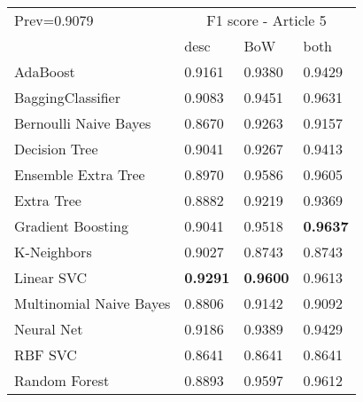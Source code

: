 \begin{tabular}{|l|l|l|l| }
\hline
Prev=0.9079 &  \multicolumn{3}{c|}{F1 score - Article 5} \\
\cline{2-4} & desc & BoW & both \\ \hline
AdaBoost                & 0.9161 & 0.9380 & 0.9429\\
BaggingClassifier       & 0.9083 & 0.9451 & 0.9631\\
Bernoulli Naive Bayes   & 0.8670 & 0.9263 & 0.9157\\
Decision Tree           & 0.9041 & 0.9267 & 0.9413\\
Ensemble Extra Tree     & 0.8970 & 0.9586 & 0.9605\\
Extra Tree              & 0.8882 & 0.9219 & 0.9369\\
Gradient Boosting       & 0.9041 & 0.9518 & {\bf 0.9637}\\
K-Neighbors             & 0.9027 & 0.8743 & 0.8743\\
Linear SVC              & {\bf 0.9291} & {\bf 0.9600} & 0.9613\\
Multinomial Naive Bayes & 0.8806 & 0.9142 & 0.9092\\
Neural Net              & 0.9186 & 0.9389 & 0.9429\\
RBF SVC                 & 0.8641 & 0.8641 & 0.8641\\
Random Forest           & 0.8893 & 0.9597 & 0.9612\\
\hline
\end{tabular}